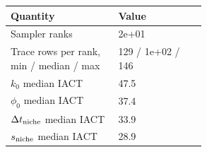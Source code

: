 \begin{tabularx}{\linewidth}{@{}p{0.55\linewidth}X@{}}
\toprule
Quantity & Value \\
\midrule
Sampler ranks & 2e+01 \\
Trace rows per rank, min / median / max & 129 / 1e+02 / 146 \\
$k_0$ median IACT & 47.5 \\
$\phi_0$ median IACT & 37.4 \\
$\Delta t_{\rm niche}$ median IACT & 33.9 \\
$s_{\rm niche}$ median IACT & 28.9 \\
\bottomrule
\end{tabularx}

